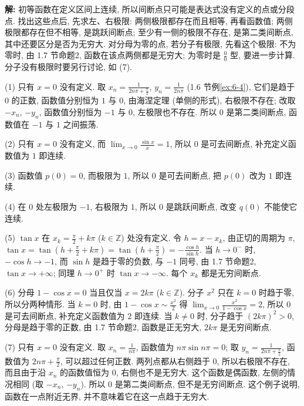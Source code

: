 \documentclass[UTF8,openany]{ctexbook}
\theoremstyle{chinesetextbook}
\newenvironment{cnsolution}{\par\indent\textbf{解:} \ignorespaces}{\par}
\begin{document}
\begin{cnsolution}
初等函数在定义区间上连续, 所以间断点只可能是表达式没有定义的点或分段点. 找出这些点后, 先求左、右极限: 两侧极限都存在而且相等, 再看函数值; 两侧极限都存在但不相等, 是跳跃间断点; 至少有一侧的极限不存在, 是第二类间断点, 其中还要区分是否为无穷大. 对分母为零的点, 若分子有极限, 先看这个极限: 不为零时, 由 1.7 节命题2, 函数在该点两侧都是无穷大; 为零时是 $\displaystyle\frac00$ 型, 要进一步计算. 分子没有极限时要另行讨论, 如 (7).

(1) 只有 $x=0$ 没有定义. 取 $\displaystyle x_n=\frac1{2n\pi+\frac\pi2}$, $\displaystyle y_n=\frac1{2n\pi}$ (1.6 节例\ref{ex:6-4}), 它们是趋于 $0$ 的正数, 函数值分别恒为 $1$ 与 $0$, 由海涅定理 (单侧的形式), 右极限不存在; 改取 $-x_n$, $-y_n$, 函数值分别恒为 $-1$ 与 $0$, 左极限也不存在. 所以 $0$ 是第二类间断点, 函数值在 $-1$ 与 $1$ 之间振荡.

(2) 只有 $x=0$ 没有定义, 而 $\displaystyle\lim_{x\to0}\frac{\sin x}x=1$, 所以 $0$ 是可去间断点, 补充定义函数值为 $1$ 即连续.

(3) 函数值 $p(0)=0$, 而极限为 $1$, 所以 $0$ 是可去间断点, 把 $p(0)$ 改为 $1$ 即连续.

(4) 在 $0$ 处左极限为 $-1$, 右极限为 $1$, 所以 $0$ 是跳跃间断点, 改变 $q(0)$ 不能使它连续.

(5) $\tan x$ 在 $\displaystyle x_k=\frac\pi2+k\pi$ ($k\in\mathbb Z$) 处没有定义. 令 $h=x-x_k$, 由正切的周期为 $\pi$, $\displaystyle\tan x=\tan\left(h+\frac\pi2+k\pi\right)=\tan\left(h+\frac\pi2\right)=-\frac{\cos h}{\sin h}$. 当 $h\to0^-$ 时, $-\cos h\to-1$, 而 $\sin h$ 是趋于零的负数, 与 $-1$ 同号, 由 1.7 节命题2, $\tan x\to+\infty$; 同理 $h\to0^+$ 时 $\tan x\to-\infty$. 每个 $x_k$ 都是无穷间断点.

(6) 分母 $1-\cos x=0$ 当且仅当 $x=2k\pi$ ($k\in\mathbb Z$). 分子 $x^2$ 只在 $k=0$ 时趋于零, 所以分两种情形. 当 $k=0$ 时, 由 $\displaystyle1-\cos x\sim\frac{x^2}2$ 得 $\displaystyle\lim_{x\to0}\frac{x^2}{1-\cos x}=2$, 所以 $0$ 是可去间断点, 补充定义函数值为 $2$ 即连续. 当 $k\ne0$ 时, 分子趋于 $(2k\pi)^2>0$, 分母是趋于零的正数, 由 1.7 节命题2, 函数是正无穷大, $2k\pi$ 是无穷间断点.

(7) 只有 $x=0$ 没有定义. 取 $\displaystyle x_n=\frac1{n\pi}$, 函数值为 $n\pi\sin n\pi=0$; 取 $\displaystyle y_n=\frac1{2n\pi+\frac\pi2}$, 函数值为 $\displaystyle2n\pi+\frac\pi2$, 可以超过任何正数. 两列点都从右侧趋于 $0$, 所以右极限不存在, 而且由于沿 $x_n$ 的函数值恒为 $0$, 右侧也不是无穷大. 这个函数是偶函数, 左侧的情况相同 (取 $-x_n$, $-y_n$). 所以 $0$ 是第二类间断点, 但不是无穷间断点. 这个例子说明, 函数在一点附近无界, 并不意味着它在这一点趋于无穷大.
\end{cnsolution}
\end{document}
